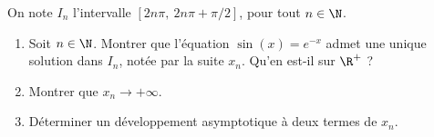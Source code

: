 \begin{enonce}
\begin{exercise}[ID={RMS135 E1446},subtitle={IMT MP 2024},tags={},difficulty={}]

On note $I_n$ l’intervalle $[2n\pi,\ 2n\pi + \pi/2]$, pour tout $n \in \N$.

\begin{enumerate}
  \item Soit $n \in \N$. Montrer que l’équation $\sin(x) = e^{-x}$ admet une unique solution dans $I_n$, notée par la suite $x_n$. Qu’en est-il sur $\R^+$ ?
  \item Montrer que $x_n \to +\infty$.
  \item Déterminer un développement asymptotique à deux termes de $x_n$.
\end{enumerate}

\end{exercise}
\begin{solution}
\end{solution}
\end{enonce}

